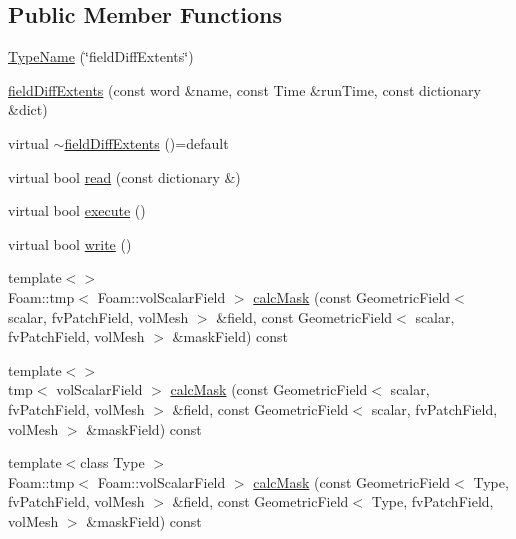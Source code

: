 \subsection*{Public Member Functions}
\begin{DoxyCompactItemize}
\item 
\hyperlink{classFoam_1_1functionObjects_1_1fieldDiffExtents_a914608c62c839c3d4fffbceaa4bac1e7}{Type\+Name} (\char`\"{}field\+Diff\+Extents\char`\"{})
\item 
\hyperlink{classFoam_1_1functionObjects_1_1fieldDiffExtents_a2c8b6a1e125dd0c264de9d6c2e841eb1}{field\+Diff\+Extents} (const word \&name, const Time \&run\+Time, const dictionary \&dict)
\item 
virtual \hyperlink{classFoam_1_1functionObjects_1_1fieldDiffExtents_a927f78f5eff59b4ffac15362e1c31d87}{$\sim$field\+Diff\+Extents} ()=default
\item 
virtual bool \hyperlink{classFoam_1_1functionObjects_1_1fieldDiffExtents_afac0600fef97b05534a595ce00b272ed}{read} (const dictionary \&)
\item 
virtual bool \hyperlink{classFoam_1_1functionObjects_1_1fieldDiffExtents_ae006844a02161d12182ab372ca5c257b}{execute} ()
\item 
virtual bool \hyperlink{classFoam_1_1functionObjects_1_1fieldDiffExtents_ae8f6374e29a250261b3979bbd6e5cb40}{write} ()
\item 
{\footnotesize template$<$$>$ }\\Foam\+::tmp$<$ Foam\+::vol\+Scalar\+Field $>$ \hyperlink{classFoam_1_1functionObjects_1_1fieldDiffExtents_a16fe075f88f49c4c5a90876f29528519}{calc\+Mask} (const Geometric\+Field$<$ scalar, fv\+Patch\+Field, vol\+Mesh $>$ \&field, const Geometric\+Field$<$ scalar, fv\+Patch\+Field, vol\+Mesh $>$ \&mask\+Field) const
\item 
{\footnotesize template$<$$>$ }\\tmp$<$ vol\+Scalar\+Field $>$ \hyperlink{classFoam_1_1functionObjects_1_1fieldDiffExtents_a56cc70d0ad07d5fe4bb5d8106a90e42e}{calc\+Mask} (const Geometric\+Field$<$ scalar, fv\+Patch\+Field, vol\+Mesh $>$ \&field, const Geometric\+Field$<$ scalar, fv\+Patch\+Field, vol\+Mesh $>$ \&mask\+Field) const
\item 
{\footnotesize template$<$class Type $>$ }\\Foam\+::tmp$<$ Foam\+::vol\+Scalar\+Field $>$ \hyperlink{classFoam_1_1functionObjects_1_1fieldDiffExtents_aaed56e89f95b6122ca493701fc6569d5}{calc\+Mask} (const Geometric\+Field$<$ Type, fv\+Patch\+Field, vol\+Mesh $>$ \&field, const Geometric\+Field$<$ Type, fv\+Patch\+Field, vol\+Mesh $>$ \&mask\+Field) const
\end{DoxyCompactItemize}

